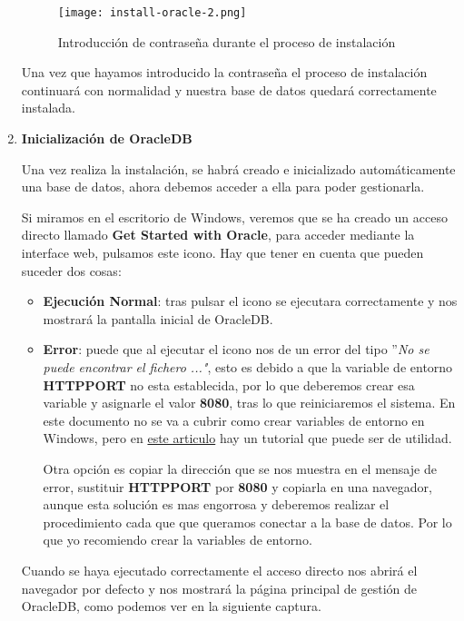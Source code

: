 \begin{enumerate}
    \begin{figure}[ht]
        \centering
        \texttt{[image: install-oracle-2.png]}
        \caption{Introducción de contraseña durante el proceso de instalación}
    \end{figure}

    Una vez que hayamos introducido la contraseña el proceso de instalación continuará con normalidad y nuestra base de datos quedará correctamente instalada.

    \item \textbf{Inicialización de OracleDB}

    Una vez realiza la instalación, se habrá creado e inicializado automáticamente una base de datos, ahora debemos acceder a ella para poder gestionarla.

    Si miramos en el escritorio de Windows, veremos que se ha creado un acceso directo llamado \textbf{Get Started with Oracle}, para acceder mediante la interface web, pulsamos este icono. Hay que tener en cuenta que pueden suceder dos cosas:

    \begin{itemize}
        \item \textbf{Ejecución Normal}: tras pulsar el icono se ejecutara correctamente y nos mostrará la pantalla inicial de OracleDB.
        \item \textbf{Error}: puede que al ejecutar el icono nos de un error del tipo ''\textit{No se puede encontrar el fichero ..."}, esto es debido a que la variable de entorno \textbf{HTTPPORT} no esta establecida, por lo que deberemos crear esa variable y asignarle el valor \textbf{8080}, tras lo que reiniciaremos el sistema. En este documento no se va a cubrir como crear variables de entorno en Windows, pero en \href{https://medium.com/@01luisrene/como-agregar-variables-de-entorno-s-o-windows-10-e7f38851f11f}{este articulo} hay un tutorial que puede ser de utilidad.

        Otra opción es copiar la dirección que se nos muestra en el mensaje de error, sustituir \textbf{HTTPPORT} por \textbf{8080} y copiarla en una navegador, aunque esta solución es mas engorrosa y deberemos realizar el procedimiento cada que que queramos conectar a la base de datos. Por lo que yo recomiendo crear la variables de entorno.
    \end{itemize}

    Cuando se haya ejecutado correctamente el acceso directo nos abrirá el navegador por defecto y nos mostrará la página principal de gestión de OracleDB, como podemos ver en la siguiente captura.


\end{enumerate}
